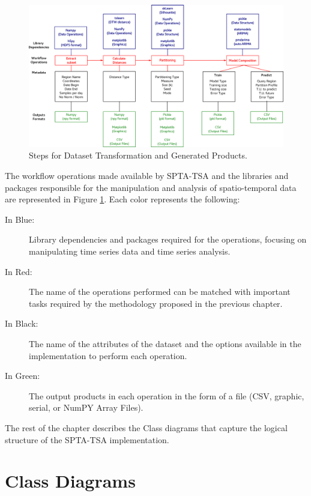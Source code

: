 \begin{figure}[tp]
	\centering
	\includegraphics[scale=0.25, angle=90]{../Figures/workflow_data_operations}
	\caption{Steps for Dataset Transformation and Generated Products.}	
	\label{Fig:Steps-Data-Transformation}	 		
\end{figure}

The workflow operations made available by SPTA-TSA and the libraries and packages responsible for the manipulation and analysis of spatio-temporal data are represented in Figure \ref{Fig:Steps-Data-Transformation}. Each color represents the following:

\begin{description}
    \item[In Blue:] Library dependencies and packages required for the operations, focusing on manipulating time series data and time series analysis.
    \item[In Red:] The name of the operations performed can be matched with important tasks required by the methodology proposed in the previous chapter.
    \item[In Black:] The name of the attributes of the dataset and the options available in the implementation to perform each operation.
    \item[In Green:] The output products in each operation in the form of a file (CSV, graphic, serial, or NumPY Array Files).
\end{description}

The rest of the chapter describes the Class diagrams that capture the logical structure of the SPTA-TSA implementation.

\section{Class Diagrams}
\label{Sec:SPT-TSAClassDiagrams}

